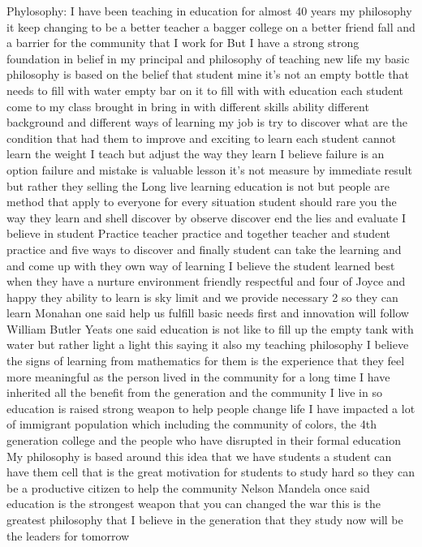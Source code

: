 \documentclass[
]{book}
\begin{document}
Phylosophy:
I have been teaching in education for almost 40 years my philosophy it keep changing to be a better teacher a bagger college on a better friend fall and a barrier for the community that I work for
But I have a strong strong foundation in belief in my principal and philosophy of teaching new life my basic philosophy is based on the belief that student mine it's not an empty bottle that needs to fill with water empty bar on it to fill with with education each student come to my class brought in bring in with different skills ability different background and different ways of learning my job is try to discover what are the condition that had them to improve and exciting to learn each student cannot learn the weight I teach but adjust the way they learn
I believe failure is an option failure and mistake is valuable lesson it's not measure by immediate result but rather they selling the Long live learning education is not but people are method that apply to everyone for every situation student should rare you the way they learn and shell discover by observe discover end the lies and evaluate I believe in student Practice teacher practice and together teacher and student practice and five ways to discover and finally student can take the learning and and come up with they own way of learning I believe the student learned best when they have a nurture environment friendly respectful and four of Joyce and happy they ability to learn is sky limit and we provide necessary 2 so they can learn Monahan one said help us fulfill basic needs first and innovation will follow William Butler Yeats one said education is not like to fill up the empty tank with water but rather light a light this saying it also my teaching philosophy I believe the signs of learning from mathematics for them is the experience that they feel more meaningful as the person lived in the community for a long time I have inherited all the benefit from the generation and the community I live in so education is raised strong weapon to help people change life I have impacted a lot of immigrant population which including the community of colors, the 4th generation college and the people who have disrupted in their formal education My philosophy is based around this idea that we have students a student can have them cell that is the great motivation for students to study hard so they can be a productive citizen to help the community Nelson Mandela once said education is the strongest weapon that you can changed the war this is the greatest philosophy that I believe in the generation that they study now will be the leaders for tomorrow
\end{document}
